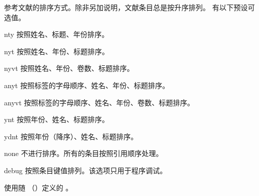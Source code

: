 \begin{optionlist}


参考文献的排序方式。除非另加说明，文献条目总是按升序排列。
有以下预设可选值。

\begin{valuelist}
\item[nty] %
按照姓名、标题、年份排序。
\item[nyt] %
按照姓名、年份、标题排序。
\item[nyvt] %
按照姓名、年份、卷数、标题排序。
\item[anyt] %
按照标签的字母顺序、姓名、年份、标题排序。
\item[anyvt] %
按照标签的字母顺序、姓名、年份、卷数、标题排序。
\item[ynt] %
按照年份、姓名、标题排序。
\item[ydnt] %
按照年份（降序）、姓名、标题排序。
\item[none] %
不进行排序。所有的条目按照引用顺序处理。
\item[debug] %
按照条目键值排列。该选项只用于程序调试。
\item[\prm{name}] %
使用随 （）定义的 。
\end{valuelist}



\end{optionlist}

